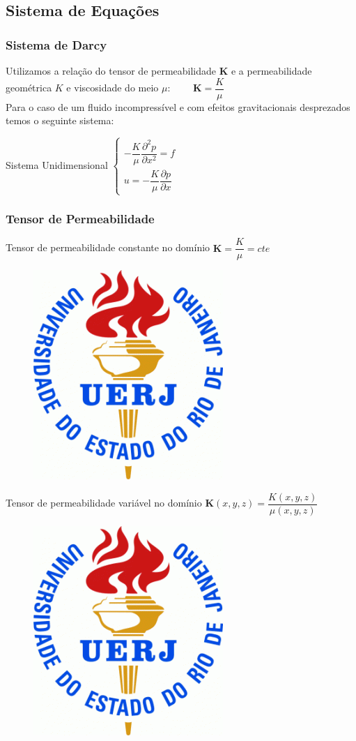 \documentclass{beamer}
\begin{document}
\subsection{Sistema de Equações}
\begin{frame}
 \frametitle{Sistema de Darcy}
Utilizamos a relação do tensor de permeabilidade $\mathbf{K}$ e a permeabilidade geométrica $K$ e viscosidade do meio $\mu$:
$\qquad \mathbf{K}=\dfrac{K}{\mu}$\\
Para o caso de um fluido incompressível e com efeitos gravitacionais desprezados temos o seguinte sistema:
 \begin{block}{Sistema Unidimensional}
\centering
$\left\{
 \begin{array}{lr}
  -\dfrac{K}{\mu}\dfrac{\partial^2 p}{\partial x^2}=f \\
  u=-\dfrac{K}{\mu}\dfrac{\partial p}{\partial x} 
 \end{array}
 \right.$
\end{block}
\end{frame}

\begin{frame}
 \frametitle{Tensor de Permeabilidade}
\begin{block}{Tensor de permeabilidade constante no domínio}
\centering
$\mathbf{K}=\dfrac{K}{\mu}=\mathit{cte}$
\end{block}
\begin{figure}
\includegraphics[width=0.3\linewidth]{figure/UERJ.png}
\end{figure}

\begin{block}{Tensor de permeabilidade variável no domínio}
\centering
$\mathbf{K}(x,y,z)=\dfrac{K(x,y,z)}{\mu(x,y,z)}$
\end{block}
\begin{figure}
\includegraphics[width=0.3\linewidth]{figure/UERJ.png}
\end{figure}

\end{frame}
\end{document}

